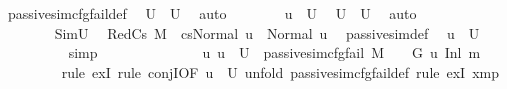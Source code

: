 \begin{isabellebody}
\ passive{\isacharunderscore}{\kern0pt}sim{\isacharunderscore}{\kern0pt}cfg{\isacharunderscore}{\kern0pt}fail{\isacharunderscore}{\kern0pt}def\ \isamarkupfalse%
\ {\isacartoucheopen}U{}\ {\isasymsubseteq}\ U{}{\isacartoucheclose}\ \isamarkupfalse%
\ auto\isanewline
\ \ \ \ \ \ \isamarkupfalse%
\ {\isachardoublequoteopen}u\ {\isasymin}\ U{}{\isachardoublequoteclose}\ \isamarkupfalse%
\ {\isacartoucheopen}U{}\ {\isasymsubseteq}\ U{}{\isacartoucheclose}\ \isamarkupfalse%
\ auto\isanewline
\ \ \ \ \ \ \isanewline
\ \ \ \ \ \ \isamarkupfalse%
\ SimU{}\ \isamarkupfalse%
\ RedCs{}{\isacharcolon}{\kern0pt}{\isachardoublequoteopen}\ M{\isacharcomma}{\kern0pt}{\isasymLambda}{}{\isacharcomma}{\kern0pt}{\isasymGamma}{\isacharcomma}{\kern0pt}{\isasymOmega}\ {\isasymturnstile}\ {\isasymlangle}cs{}{\isacharcomma}{\kern0pt}Normal\ u{\isasymrangle}\ {\isacharbrackleft}{\kern0pt}{\isasymrightarrow}{\isacharbrackright}{\kern0pt}\ Normal\ u{\isachardoublequoteclose}\ \isamarkupfalse%
\ passive{\isacharunderscore}{\kern0pt}sim{\isacharunderscore}{\kern0pt}def\ \isamarkupfalse%
\ {\isacartoucheopen}u\ {\isasymin}\ U{}{\isacartoucheclose}\isanewline
\ \ \ \ \ \ \ \ \isamarkupfalse%
\ simp\isanewline
\ \ \ \ \ \ \isanewline
\ \ \ \ \ \ \isamarkupfalse%
\ {\isachardoublequoteopen}{\isasymexists}u{\isachardot}{\kern0pt}\ u\ {\isasymin}\ U{}\ {\isasymand}\ passive{\isacharunderscore}{\kern0pt}sim{\isacharunderscore}{\kern0pt}cfg{\isacharunderscore}{\kern0pt}fail\ M\ {\isasymLambda}{}\ {\isasymGamma}\ {\isasymOmega}\ G{}\ u\ {\isacharparenleft}{\kern0pt}Inl\ m{\isacharparenright}{\kern0pt}{\isachardoublequoteclose}\isanewline
\ \ \ \ \ \ \ \isamarkupfalse%
\ {\isacharparenleft}{\kern0pt}rule\ exI{\isacharcomma}{\kern0pt}\ rule\ conjI{\isacharbrackleft}{\kern0pt}OF\ {\isacartoucheopen}u\ {\isasymin}\ U{}{\isacartoucheclose}{\isacharbrackright}{\kern0pt}{\isacharcomma}{\kern0pt}\ {\isacharparenleft}{\kern0pt}unfold\ passive{\isacharunderscore}{\kern0pt}sim{\isacharunderscore}{\kern0pt}cfg{\isacharunderscore}{\kern0pt}fail{\isacharunderscore}{\kern0pt}def{\isacharparenright}{\kern0pt}{\isacharcomma}{\kern0pt}\ rule\ exI{\isacharbrackleft}{\kern0pt}\ {\isacharquery}{\kern0pt}x{\isacharequal}{\kern0pt}m{\isacharunderscore}{\kern0pt}p{\isacharprime}{\kern0pt}{\isacharbrackright}{\kern0pt}{\isacharparenright}{\kern0pt}\isanewline

\end{isabellebody}
